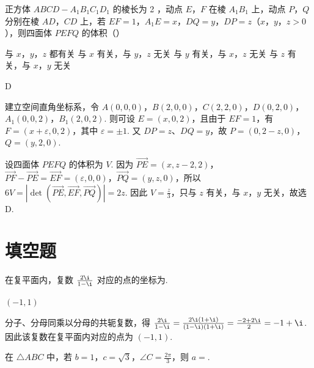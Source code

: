 \begin{problem}
正方体 \(ABCD - A_{1}B_{1}C_{1}D_{1}\) 的棱长为 2 ，动点 \(E\)，\(F\) 在棱 \(A_{1}B_{1}\) 上，动点 \(P\)，\(Q\) 分别在棱 \(AD\)，\(CD\) 上，若 \(EF = 1\)，\(A_{1}E = x\)，\(DQ = y\)，\(DP = z\)（\(x\)，\(y\)，\(z > 0\)），则四面体 \(PEFQ\) 的体积（\quad）

\choices
    {与 \(x\)，\(y\)，\(z\) 都有关}
    {与 \(x\) 有关，与 \(y\)，\(z\) 无关}
    {与 \(y\) 有关，与 \(x\)，\(z\) 无关}
    {与 \(z\) 有关，与 \(x\)，\(y\) 无关}
\end{problem}

\begin{answer}
D
\end{answer}

\begin{solution}
建立空间直角坐标系，令 \(A(0,0,0)\)，\(B(2,0,0)\)，\(C(2,2,0)\)，\(D(0,2,0)\)，\(A_{1}(0,0,2)\)，\(B_{1}(2,0,2)\). 则可设 \(E=(x,0,2)\)，且由于 \(EF=1\)，有 \(F=(x+\varepsilon,0,2)\)，其中 \(\varepsilon=\pm1\). 又 \(DP=z\)、\(DQ=y\)，故 \(P=(0,2-z,0)\)，\(Q=(y,2,0)\).

设四面体 \(PEFQ\) 的体积为 \(V\). 因为 \(\overrightarrow{PE}=(x,z-2,2)\)，\(\overrightarrow{PF}-\overrightarrow{PE}=\overrightarrow{EF}=(\varepsilon,0,0)\)，\(\overrightarrow{PQ}=(y,z,0)\)，所以 \(6V=\left\lvert\det(\overrightarrow{PE},\overrightarrow{EF},\overrightarrow{PQ})\right\rvert=2z\). 因此 \(V=\frac{z}{3}\)，只与 \(z\) 有关，与 \(x\)，\(y\) 无关，故选 D.
\end{solution}

\section{填空题}

\begin{problem}
在复平面内，复数 \( \frac{2\i}{1-\i} \) 对应的点的坐标为\fillinblank{}.
\end{problem}

\begin{answer}
\((-1,1)\)
\end{answer}

\begin{solution}
分子、分母同乘以分母的共轭复数，得 \(\frac{2\i}{1-\i}=\frac{2\i(1+\i)}{(1-\i)(1+\i)}=\frac{-2+2\i}{2}=-1+\i\). 因此该复数在复平面内对应的点为 \((-1,1)\).
\end{solution}

\begin{problem}
在 \(\triangle ABC\) 中，若 \(b = 1\)，\(c = \sqrt{3}\)，\(\angle C = \frac{2\pi}{3}\)，则 \(a = \)\fillinblank{}.
\end{problem}

